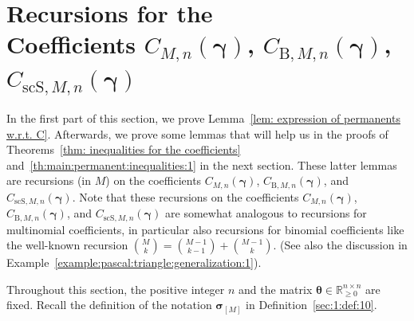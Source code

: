 \documentclass[journal,lettersize,twocolumn]{IEEEtran} %
\newcommand{\vect}[1]{ \bm{#1} }
\newcommand{\vgam}{ \vect{\gamma} }
\newcommand{\sR}{\mathbb{R}}
\newcommand{\matr}[1]{ \bm{#1} }
\newcommand{\vsigma}{ \bm{\sigma} }
\newcommand{\CM}[1]{\Cgen{M}{#1}}
\newcommand{\Cgen}[2]{C_{#1,#2}}
\newcommand{\CBM}[1]{\CBgen{M}{#1}}
\newcommand{\CBgen}[2]{C_{\mathrm{B},#1,#2}}
\newcommand{\CscSgen}[2]{C_{\mathrm{scS},#1,#2}}
\newcommand{\mtheta}{\matr{\theta}}
\begin{document}
%
%

\ifx\withclearpagecommands\x
\clearpage
\fi

\section{Recursions for the \\
              Coefficients
              \texorpdfstring{$\CM{n}( \vgam )$,
              $\CBM{n}( \vgam )$, 
              $\CscSgen{M}{n}( \vgam )$}{}}
\label{sec:recursions:coefficients:1}

%

In the first part of this section, we prove Lemma~\ref{lem: expression of
  permanents w.r.t. C}. Afterwards, we prove some lemmas that will help us in
the proofs of Theorems~\ref{thm: inequalities for the coefficients}
and~\ref{th:main:permanent:inequalities:1} in the next section. These latter
lemmas are recursions (in $M$) on the coefficients $\CM{n}( \vgam )$,
$\CBM{n}( \vgam )$, and $\CscSgen{M}{n}( \vgam )$. Note that these recursions
on the coefficients $\CM{n}( \vgam )$, $\CBM{n}( \vgam )$, and
$\CscSgen{M}{n}( \vgam )$ are somewhat analogous to recursions for multinomial
coefficients, in particular also recursions for binomial coefficients like the
well-known recursion ${M \choose k} = {M-1 \choose k-1} + {M-1 \choose
  k}$. (See also the discussion in
Example~\ref{example:pascal:triangle:generalization:1}).

%

Throughout this section, the positive integer $n$ and the matrix
$\mtheta \in \sR_{\geq 0}^{n \times n}$ are fixed. Recall the definition of
the notation $\vsigma_{[M]}$ in Definition~\ref{sec:1:def:10}.

%
\end{document}

